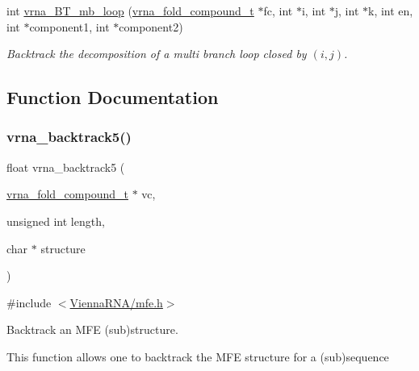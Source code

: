 \begin{DoxyCompactItemize}
int \mbox{\hyperlink{group__mfe__backtracking_ga5b62d56c9d47c1e8792b02cd6b95e78b}{vrna\+\_\+\+B\+T\+\_\+mb\+\_\+loop}} (\mbox{\hyperlink{group__fold__compound_ga1b0cef17fd40466cef5968eaeeff6166}{vrna\+\_\+fold\+\_\+compound\+\_\+t}} $\ast$fc, int $\ast$i, int $\ast$j, int $\ast$k, int en, int $\ast$component1, int $\ast$component2)
\begin{DoxyCompactList}\small\item\em Backtrack the decomposition of a multi branch loop closed by $ (i,j) $. \end{DoxyCompactList}\end{DoxyCompactItemize}


\subsection{Function Documentation}
\mbox{\label{group__mfe__backtracking_gaaee7355f060fe9eed8e687522567715e}} 
\subsubsection{\texorpdfstring{vrna\_backtrack5()}{vrna\_backtrack5()}}
{\footnotesize\ttfamily float vrna\+\_\+backtrack5 (\begin{DoxyParamCaption}\item[{\mbox{\hyperlink{group__fold__compound_ga1b0cef17fd40466cef5968eaeeff6166}{vrna\+\_\+fold\+\_\+compound\+\_\+t}} $\ast$}]{vc,  }\item[{unsigned int}]{length,  }\item[{char $\ast$}]{structure }\end{DoxyParamCaption})}



{\ttfamily \#include $<$\mbox{\hyperlink{mfe_8h}{Vienna\+R\+N\+A/mfe.\+h}}$>$}



Backtrack an M\+FE (sub)structure. 

This function allows one to backtrack the M\+FE structure for a (sub)sequence

